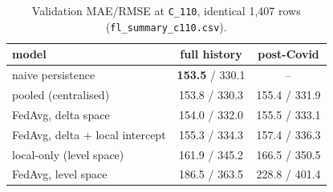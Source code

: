 \documentclass[conference]{IEEEtran}
\begin{document}
\begin{table}[t]
\caption{Validation MAE/RMSE at \texttt{C\_110}, identical 1{,}407 rows
(\texttt{fl\_summary\_c110.csv}).}
\label{tab:fl}
\centering
\begin{tabular}{lcc}
\toprule
model & full history & post-Covid \\
\midrule
naive persistence & \textbf{153.5} / 330.1 & -- \\
pooled (centralised) & 153.8 / 330.3 & 155.4 / 331.9 \\
FedAvg, delta space & 154.0 / 332.0 & 155.5 / 333.1 \\
FedAvg, delta + local intercept & 155.3 / 334.3 & 157.4 / 336.3 \\
local-only (level space) & 161.9 / 345.2 & 166.5 / 350.5 \\
FedAvg, level space & 186.5 / 363.5 & 228.8 / 401.4 \\
\bottomrule
\end{tabular}
\end{table}
\end{document}
